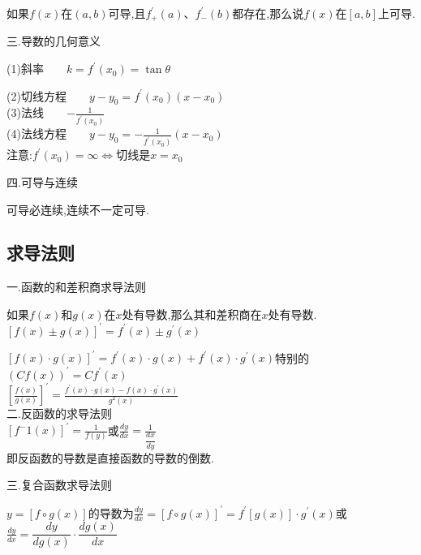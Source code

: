 \documentclass[utf8]{ctexart}
\begin{document}
如果$f(x)$在$(a,b)$可导,且$f^{\prime}_{+}(a)$、$f^{\prime}_{-}(b)$都存在,那么说$f(x)$在$\left[a,b\right] $上可导.

三.导数的几何意义

(1)斜率\ \ \ \ $k=f^{\prime}(x_0)=\tan \theta $

(2)切线方程\ \ \ \ $y-y_0=f^{\prime}(x_0)(x-x_0)$
\\

(3)法线\ \ \ \ $\displaystyle -\frac{1}{f^{\prime}(x_0)}$
\\

(4)法线方程\ \ \ \ $\displaystyle y-y_0=-\frac{1}{f^{\prime}(x_0)}(x-x_0) $
\\

注意:$f^{\prime}(x_0)=\infty\Leftrightarrow \text{切线是}x=x_0$

四.可导与连续

可导必连续,连续不一定可导.

\subsection{\heiti 求导法则}

一.函数的和差积商求导法则

如果$f(x)$和$g(x)$在$x$处有导数,那么其和差积商在$x$处有导数.\\


$\left[f(x)\pm g(x)\right]^\prime = f^\prime (x) \pm g^\prime (x)$

$\left[f(x)\cdot g(x)\right]^\prime = f^\prime (x) \cdot g (x)+f^\prime (x) \cdot g^\prime (x)$特别的$(Cf(x))^\prime =Cf^\prime (x)$\\

$\displaystyle  \left[\frac{f(x)}{g(x)}\right]^\prime = \frac{ f^\prime (x) \cdot g (x) - f(x) \cdot g^\prime (x)}{g^2(x)}$\\

二.反函数的求导法则\\

$\displaystyle \left[f^-1(x)\right]^\prime = \frac{1}{f(y)} $或$\displaystyle \frac{dy}{dx}= \frac{1}{ \dfrac{dx}{dy}}$\\


即反函数的导数是直接函数的导数的倒数.

三.复合函数求导法则

$y=\left[f\circ g(x)\right]$的导数为$\displaystyle \frac{dy}{dx} =\left[f\circ g(x)\right]^\prime =f^\prime  \left[g(x)\right]\cdot g^\prime (x) $或$\displaystyle \frac{dy}{dx}={\dfrac{dy}{dg(x)}}\cdot {\dfrac{dg(x)}{dx}}$\\
\end{document}
